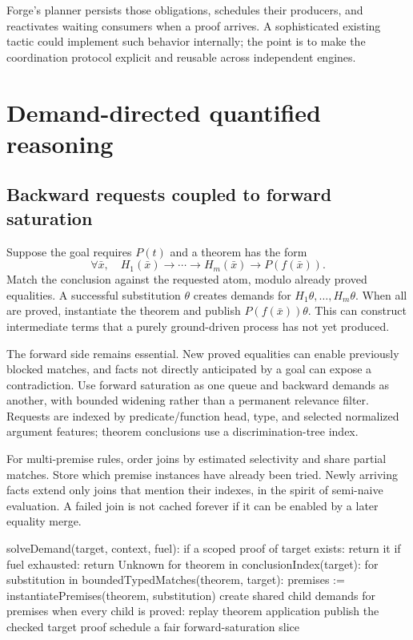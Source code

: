 \documentclass[11pt,a4paper]{article}
\begin{document}
Forge's planner persists those obligations, schedules their producers, and
reactivates waiting consumers when a proof arrives. A sophisticated existing
tactic could implement such behavior internally; the point is to make the
coordination protocol explicit and reusable across independent engines.

\section{Demand-directed quantified reasoning}
\label{sec:demand}

\subsection{Backward requests coupled to forward saturation}
Suppose the goal requires $P(t)$ and a theorem has the form
\[
 \forall \bar x,\quad H_1(\bar x)\to\cdots\to H_m(\bar x)\to P(f(\bar x)).
\]
Match the conclusion against the requested atom, modulo already proved
equalities. A successful substitution $\theta$ creates demands for
$H_1\theta,\ldots,H_m\theta$. When all are proved, instantiate the theorem and
publish $P(f(\bar x))\theta$. This can construct intermediate terms that a
purely ground-driven process has not yet produced.

The forward side remains essential. New proved equalities can enable previously
blocked matches, and facts not directly anticipated by a goal can expose a
contradiction. Use forward saturation as one queue and backward demands as
another, with bounded widening rather than a permanent relevance filter.
Requests are indexed by predicate/function head, type, and selected normalized
argument features; theorem conclusions use a discrimination-tree index.

For multi-premise rules, order joins by estimated selectivity and share partial
matches. Store which premise instances have already been tried. Newly arriving
facts extend only joins that mention their indexes, in the spirit of semi-naive
evaluation. A failed join is not cached forever if it can be enabled by a later
equality merge.

\begin{Code}
solveDemand(target, context, fuel):
    if a scoped proof of target exists: return it
    if fuel exhausted: return Unknown
    for theorem in conclusionIndex(target):
        for substitution in boundedTypedMatches(theorem, target):
            premises := instantiatePremises(theorem, substitution)
            create shared child demands for premises
            when every child is proved:
                replay theorem application
                publish the checked target proof
    schedule a fair forward-saturation slice
\end{Code}
\end{document}
